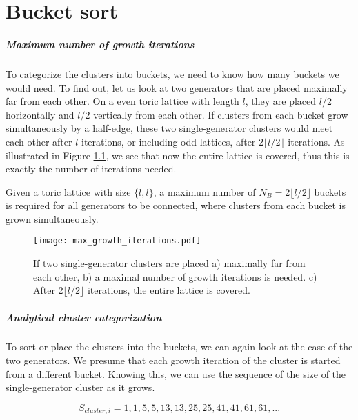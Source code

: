 \chapter{Bucket sort}\label{ap.bucketsort}

\paragraph{Maximum number of growth iterations}
To categorize the clusters into buckets, we need to know how many buckets we would need. To find out, let us look at two generators that are placed maximally far from each other. On a even toric lattice with length $l$, they are placed $l/2$ horizontally and $l/2$ vertically from each other. If clusters from each bucket grow simultaneously by a half-edge, these two single-generator clusters would meet each other after $l$ iterations, or including odd lattices, after $2\lfloor l/2 \rfloor$ iterations. As illustrated in Figure \ref{3.fig.maxgrowthit}, we see that now the entire lattice is covered, thus this is exactly the number of iterations needed.

\begin{lemma}
  Given a toric lattice with size $\{l,l\}$, a maximum number of $N_B = 2\lfloor l/2 \rfloor$ buckets is required for all generators to be connected, where clusters from each bucket is grown simultaneously.
\end{lemma}

\begin{figure}[h]
  \centering
  \texttt{[image: max\_growth\_iterations.pdf]}
  \caption{If two single-generator clusters are placed a) maximally far from each other, b) a maximal number of growth iterations is needed. c) After $2\lfloor l/2 \rfloor$ iterations, the entire lattice is covered.}\label{3.fig.maxgrowthit}
\end{figure}

\paragraph{Analytical cluster categorization}
To sort or place the clusters into the buckets, we can again look at the case of the two generators. We presume that each growth iteration of the cluster is started from a different bucket. Knowing this, we can use the sequence of the size of the single-generator cluster as it grows.

\begin{equation}\label{3.eq.sequence}
  S_{cluster, i} = 1, 1, 5, 5, 13, 13, 25, 25, 41, 41, 61, 61, ...
\end{equation}

